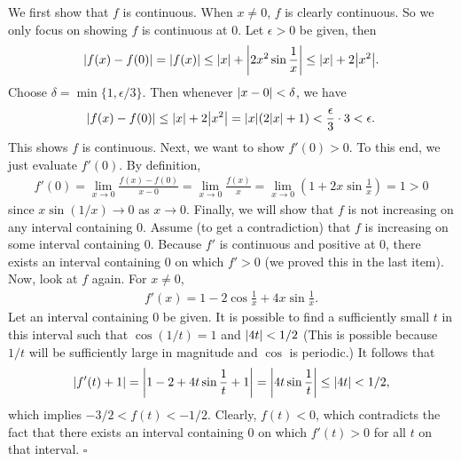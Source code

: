 \documentclass[11pt]{article}
\newcommand{\f}[2]{\frac{#1}{#2}}
\begin{document}
\begin{enumerate}[(a)]
	We first show that $f$ is continuous. When $x\neq 0$, $f$ is clearly continuous. So we only focus on showing $f$ is continuous at $0$. Let $\epsilon > 0$ be given, then
	\begin{align*}
	\abs{f(x) - f(0)} = \abs{f(x)} \leq \abs{x} + \abs{2x^2 \sin\f{1}{x}} \leq \abs{x} + 2\abs{x^2}. 
	\end{align*}
	Choose $\delta = \min\{1, \epsilon/3\}$. Then whenever $\abs{x-0} < \delta$, we have
	\begin{align*}
	\abs{f(x) - f(0)} \leq \abs{x} + 2\abs{x^2} = \abs{x}(2\abs{x} + 1) < \f{\epsilon}{3}\cdot 3 < \epsilon.
	\end{align*}
	This shows $f$ is continuous. Next, we want to show $f'(0) > 0$. To this end, we just evaluate $f'(0)$. By definition,
	\begin{align*}
	f'(0) = \lim_{x\to 0} \f{f(x) - f(0)}{x-0} = \lim_{x\to 0 }\f{f(x)}{x} = \lim_{x\to 0} \left( 1 + 2x\sin\f{1}{x}\right)= 1 > 0
	\end{align*}
	since $x\sin(1/x) \to 0$ as $x\to 0$. Finally, we will show that $f$ is not increasing on any interval containing 0. Assume (to get a contradiction) that $f$ is increasing on some interval containing 0. Because $f'$ is continuous and positive at 0, there exists an interval containing 0 on which $f'>0$ (we proved this in the last item). Now, look at $f$ again. For $x\neq 0$, 
	\begin{align*}
	f'(x) = 1-2\cos\f{1}{x} + 4x\sin\f{1}{x}.
	\end{align*}
	Let an interval containing $0$ be given. It is possible to find a sufficiently small $t$ in this interval such that $\cos(1/t) = 1$ and $\abs{4t} < 1/2$ (This is possible because $1/t$ will be sufficiently large in magnitude and $\cos$ is periodic.) It follows that
	\begin{align*}
	\abs{f'(t) + 1} = \abs{1-2 + 4t\sin\f{1}{t} + 1} = \abs{4t\sin\f{1}{t}} \leq \abs{4t} < 1/2,  
	\end{align*} 
	which implies $-3/2 < f(t) < -1/2$. Clearly, $f(t) < 0$, which contradicts the fact that there exists an interval containing 0 on which $f'(t) > 0$ for all $t$ on that interval.  \hfill $\square$
	
	
	
	
	
	
	
	
	
	
	
	
	
	
	
	
	

\end{enumerate}
\end{document}
